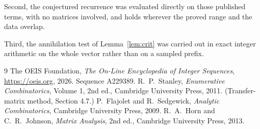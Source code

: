 \documentclass[11pt,a4paper]{article}
\theoremstyle{plain}
\theoremstyle{definition}
\begin{document}
Second, the conjectured recurrence was evaluated directly on those published terms, with no
matrices involved, and holds wherever the proved range and the data overlap.

Third, the annihilation test of Lemma~\ref{lem:crit} was carried out in exact integer
arithmetic on the whole vector rather than on a sampled prefix.

\begin{thebibliography}{9}
 The OEIS Foundation, \emph{The On-Line Encyclopedia of Integer
Sequences}, \url{https://oeis.org}, 2026. Sequence A229389.
 R.~P.~Stanley, \emph{Enumerative Combinatorics}, Volume 1, 2nd ed.,
Cambridge University Press, 2011. (Transfer-matrix method, Section 4.7.)
 P.~Flajolet and R.~Sedgewick, \emph{Analytic Combinatorics}, Cambridge
University Press, 2009.
 R.~A.~Horn and C.~R.~Johnson, \emph{Matrix Analysis}, 2nd ed., Cambridge
University Press, 2013.
\end{thebibliography}
\end{document}
